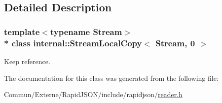 \subsection{Detailed Description}
\subsubsection*{template$<$typename Stream$>$\\*
class internal\+::\+Stream\+Local\+Copy$<$ Stream, 0 $>$}

Keep reference. 

The documentation for this class was generated from the following file\+:\begin{DoxyCompactItemize}
\item 
Commun/\+Externe/\+Rapid\+J\+S\+O\+N/include/rapidjson/\hyperlink{reader_8h}{reader.\+h}\end{DoxyCompactItemize}
